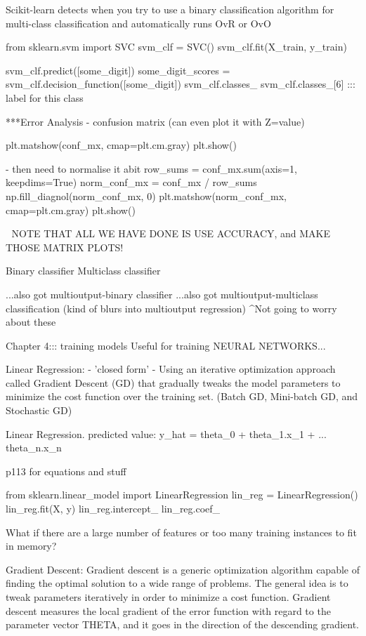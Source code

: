 Scikit-learn detects when you try to use a binary classification algorithm for multi-class classification
and automatically runs OvR or OvO

from sklearn.svm import SVC
svm_clf = SVC()
svm_clf.fit(X_train, y_train)

svm_clf.predict([some_digit])
some_digit_scores = svm_clf.decision_function([some_digit])
svm_clf.classes_
svm_clf.classes_[6] ::: label for this class

***Error Analysis
- confusion matrix (can even plot it with Z=value)

plt.matshow(conf_mx, cmap=plt.cm.gray)
plt.show()

- then need to normalise it abit
row_sums = conf_mx.sum(axis=1, keepdims=True)
norm_conf_mx = conf_mx / row_sums
np.fill_diagnol(norm_conf_mx, 0)
plt.matshow(norm_conf_mx, cmap=plt.cm.gray)
plt.show()

^^^
NOTE THAT ALL WE HAVE DONE IS USE ACCURACY, and MAKE THOSE MATRIX PLOTS!

Binary classifier
Multiclass classifier

...also got multioutput-binary classifier
...also got multioutput-multiclass classification (kind of blurs into multioutput regression)
^Not going to worry about these








Chapter 4::: training models
Useful for training NEURAL NETWORKS...

Linear Regression:
- 'closed form'
-
Using an iterative optimization approach called Gradient Descent (GD)
that gradually tweaks the model parameters to minimize the cost function over the training set.
(Batch GD, Mini-batch GD, and Stochastic GD)

Linear Regression.
predicted value: y_hat = theta_0 + theta_1.x_1 + ... theta_n.x_n

p113 for equations and stuff

from sklearn.linear_model import LinearRegression
lin_reg = LinearRegression()
lin_reg.fit(X, y)
lin_reg.intercept_
lin_reg.coef_

What if there are a large number of features
or too many training instances to fit in memory?

Gradient Descent:
Gradient descent is a generic optimization algorithm capable of finding the optimal solution to a wide range of problems. 
The general idea is to tweak parameters iteratively in order to minimize a cost function.
Gradient descent measures the local gradient of the error function with regard to the parameter vector THETA,
and it goes in the direction of the descending gradient.

